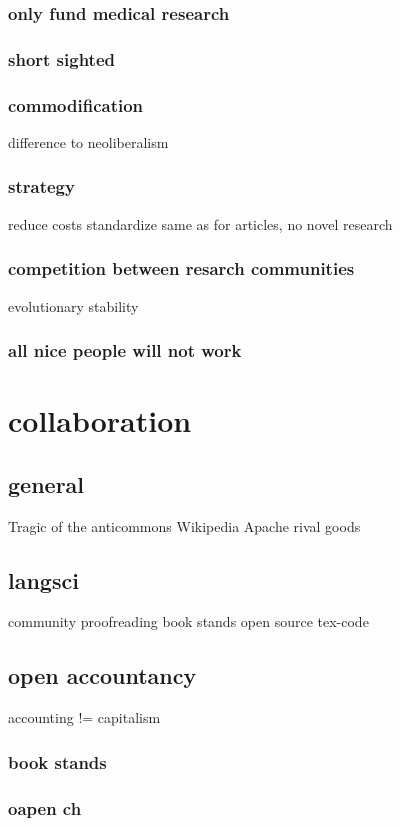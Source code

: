 \documentclass[12pt]{article}
\begin{document}
\subsubsection{only fund medical research}
\subsubsection{short sighted}
\subsubsection{commodification}
                    difference to neoliberalism
\subsubsection{strategy}
                    reduce costs
                    standardize
                    same as for articles, no novel research
\subsubsection{competition between resarch communities}
            evolutionary stability
\subsubsection{all nice people will not work}
\section{collaboration}
\subsection{general}
            Tragic of the anticommons
            Wikipedia
            Apache
            rival goods
\subsection{langsci}
            community proofreading 
            book stands
            open source
            tex-code
\subsection{open accountancy}
            accounting != capitalism
\subsubsection{book stands}
\subsubsection{oapen ch}
\end{document}
